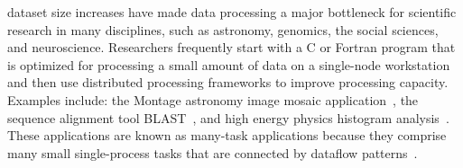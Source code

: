 \documentclass[10pt,journal,compsoc]{IEEEtran}
\begin{document}
%
\IEEEpeerreviewmaketitle








% 
% 
% 
% 
 dataset size increases have made data processing a major bottleneck for scientific research in many disciplines, such as astronomy, genomics, the social sciences, and neuroscience.
Researchers frequently start with a C or Fortran program that is optimized for processing a small amount of data on a single-node workstation and then use distributed processing frameworks to improve processing capacity. Examples include: the Montage astronomy image mosaic application~\cite{jacob09},  the sequence alignment tool BLAST~\cite{altschul90}, and high energy physics histogram analysis~\cite{ekanayake08}.
These applications are known as many-task applications because they comprise many small single-process tasks that are connected by dataflow patterns~\cite{raicu08}.
\end{document}

